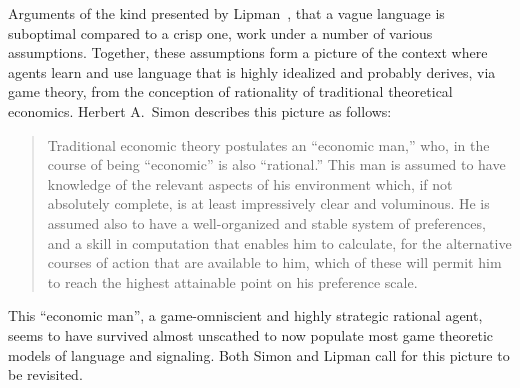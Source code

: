 \documentclass[a4paper]{article}
\begin{document}
Arguments of the kind presented by Lipman~\parencite*{lipman_why_2009}, that a vague language is suboptimal compared to a crisp one, work under a number of various assumptions.
Together, these assumptions form a picture of the context where agents learn and use language that is highly idealized and probably derives, via game theory, from the conception of rationality of traditional theoretical economics.
Herbert A.~Simon describes this picture as follows:
\begin{quote}
Traditional economic theory postulates an ``economic man,'' who, in the course of being ``economic'' is also ``rational.''
This man is assumed to have knowledge of the relevant aspects of his environment which, if not absolutely complete, is at least impressively clear and voluminous.
He is assumed also to have a well-organized and stable system of preferences, and a skill in computation that enables him to calculate, for the alternative courses of action that are available to him, which of these will permit him to reach the highest attainable point on his preference scale.%
~\parencite[99]{simon_behavioral_1955}
\end{quote}
This ``economic man'', a game-omniscient and highly strategic rational agent, seems to have survived almost unscathed to now populate most game theoretic models of language and signaling.
Both Simon and Lipman call for this picture to be revisited.
\end{document}

